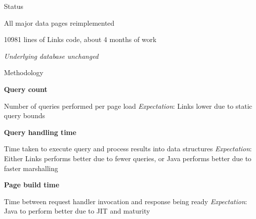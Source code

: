 \documentclass[11.5pt, aspectratio=169]{beamer}
\begin{document}
\begin{frame}{Status}
  \vspace{1em}

  {\large
  \begin{fullpageitemize}
  \item All major data pages reimplemented
  \item 10981 lines of Links code, about 4 months of work
  \item \emph{Underlying database unchanged}
  \end{fullpageitemize}
  }
\end{frame}


\begin{frame}{Methodology}

  \begin{fullpageitemize}
  \item<1->{\Large \textbf{Query count} }
    \begin{itemize}
      \itemR Number of queries performed per page load
      \itemR \emph{Expectation}: Links lower due to static query bounds
    \end{itemize}
    \vspace{1em}
  \item<2->{\Large \textbf{Query handling time} }
    \begin{itemize}
      \itemR Time taken to execute query and process results into data
        structures
      \itemR \emph{Expectation}: Either Links performs better due to fewer queries, or
        Java performs better due to faster marshalling
    \end{itemize}
    \vspace{1em}
  \item<3->{\Large \textbf{Page build time} }
    \begin{itemize}
      \itemR Time between request handler invocation and response being ready
      \itemR \emph{Expectation}: Java to perform better due to JIT and maturity
    \end{itemize}
  \end{fullpageitemize}
    \vspace{1em}

\end{frame}
\end{document}
